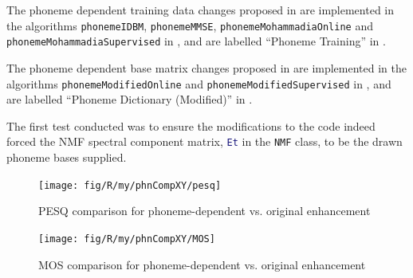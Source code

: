 The phoneme dependent training data changes proposed in 
are implemented in the algorithms \lstinline[breaklines=true]!phonemeIDBM!,
\lstinline[breaklines=true]!phonemeMMSE!, \lstinline[breaklines=true]!phonemeMohammadiaOnline!
and\linebreak{}
\lstinline[breaklines=true]!phonemeMohammadiaSupervised! in ,
and are labelled ``Phoneme Training'' in .

The phoneme dependent base matrix changes proposed in 
are implemented in the algorithms \lstinline[breaklines=true]!phonemeModifiedOnline!
and \lstinline[breaklines=true]!phonemeModifiedSupervised! in ,
and are labelled ``Phoneme Dictionary (Modified)'' in .

The first test conducted was to ensure the modifications to the code
indeed forced the \ac{NMF} spectral component matrix, \lstinline[language=Matlab]!Et!
in the \lstinline[language=bash]!NMF! class, to be the drawn phoneme
bases supplied.

\begin{figure}[h]
\noindent \begin{centering}
\texttt{[image: fig/R/my/phnCompXY/pesq]}
\par\end{centering}

\protect\caption{\label{fig:pesq-comparison-phn}\acs{PESQ} comparison for phoneme-dependent
vs. original enhancement}
\end{figure}


\begin{figure}[h]
\noindent \begin{centering}
\texttt{[image: fig/R/my/phnCompXY/MOS]}
\par\end{centering}

\protect\caption{\label{fig:mos-comparison-phn}\foreignlanguage{australian}{\acs{MOS}
comparison for phoneme-dependent vs. original enhancement}%
}
\end{figure}


